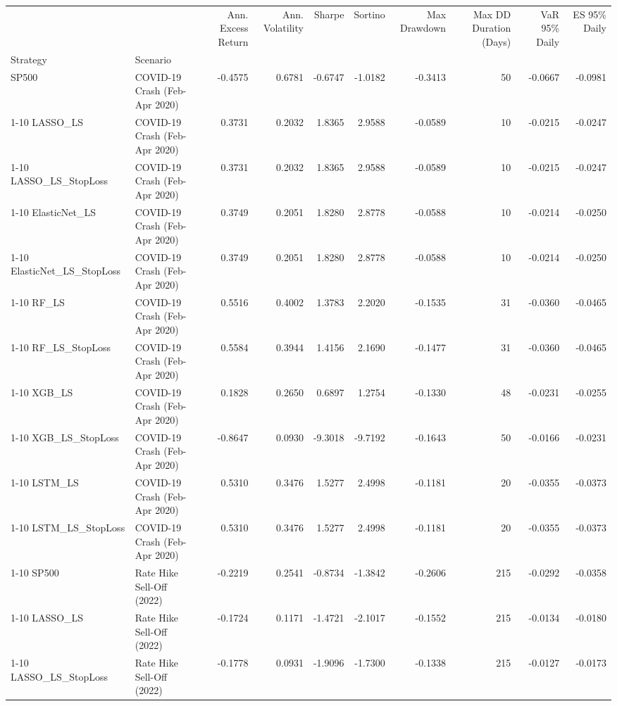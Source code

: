 \begin{tabular}{llrrrrrrrr}
\toprule
 &  & Ann. Excess Return & Ann. Volatility & Sharpe & Sortino & Max Drawdown & Max DD Duration (Days) & VaR 95\% Daily & ES 95\% Daily \\
Strategy & Scenario &  &  &  &  &  &  &  &  \\
\midrule
SP500 & COVID-19 Crash (Feb-Apr 2020) & -0.4575 & 0.6781 & -0.6747 & -1.0182 & -0.3413 & 50 & -0.0667 & -0.0981 \\
\cline{1-10}
LASSO\_LS & COVID-19 Crash (Feb-Apr 2020) & 0.3731 & 0.2032 & 1.8365 & 2.9588 & -0.0589 & 10 & -0.0215 & -0.0247 \\
\cline{1-10}
LASSO\_LS\_StopLoss & COVID-19 Crash (Feb-Apr 2020) & 0.3731 & 0.2032 & 1.8365 & 2.9588 & -0.0589 & 10 & -0.0215 & -0.0247 \\
\cline{1-10}
ElasticNet\_LS & COVID-19 Crash (Feb-Apr 2020) & 0.3749 & 0.2051 & 1.8280 & 2.8778 & -0.0588 & 10 & -0.0214 & -0.0250 \\
\cline{1-10}
ElasticNet\_LS\_StopLoss & COVID-19 Crash (Feb-Apr 2020) & 0.3749 & 0.2051 & 1.8280 & 2.8778 & -0.0588 & 10 & -0.0214 & -0.0250 \\
\cline{1-10}
RF\_LS & COVID-19 Crash (Feb-Apr 2020) & 0.5516 & 0.4002 & 1.3783 & 2.2020 & -0.1535 & 31 & -0.0360 & -0.0465 \\
\cline{1-10}
RF\_LS\_StopLoss & COVID-19 Crash (Feb-Apr 2020) & 0.5584 & 0.3944 & 1.4156 & 2.1690 & -0.1477 & 31 & -0.0360 & -0.0465 \\
\cline{1-10}
XGB\_LS & COVID-19 Crash (Feb-Apr 2020) & 0.1828 & 0.2650 & 0.6897 & 1.2754 & -0.1330 & 48 & -0.0231 & -0.0255 \\
\cline{1-10}
XGB\_LS\_StopLoss & COVID-19 Crash (Feb-Apr 2020) & -0.8647 & 0.0930 & -9.3018 & -9.7192 & -0.1643 & 50 & -0.0166 & -0.0231 \\
\cline{1-10}
LSTM\_LS & COVID-19 Crash (Feb-Apr 2020) & 0.5310 & 0.3476 & 1.5277 & 2.4998 & -0.1181 & 20 & -0.0355 & -0.0373 \\
\cline{1-10}
LSTM\_LS\_StopLoss & COVID-19 Crash (Feb-Apr 2020) & 0.5310 & 0.3476 & 1.5277 & 2.4998 & -0.1181 & 20 & -0.0355 & -0.0373 \\
\cline{1-10}
SP500 & Rate Hike Sell-Off (2022) & -0.2219 & 0.2541 & -0.8734 & -1.3842 & -0.2606 & 215 & -0.0292 & -0.0358 \\
\cline{1-10}
LASSO\_LS & Rate Hike Sell-Off (2022) & -0.1724 & 0.1171 & -1.4721 & -2.1017 & -0.1552 & 215 & -0.0134 & -0.0180 \\
\cline{1-10}
LASSO\_LS\_StopLoss & Rate Hike Sell-Off (2022) & -0.1778 & 0.0931 & -1.9096 & -1.7300 & -0.1338 & 215 & -0.0127 & -0.0173 \\

\end{tabular}
